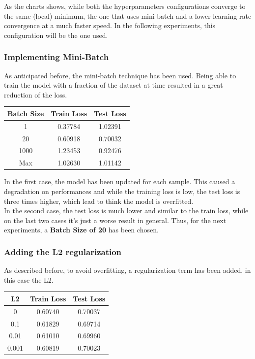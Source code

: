 \documentclass[
	letterpaper, %
	10pt, %
]{class}
\begin{document}
As the charts shows, while both the hyperparameters configurations converge to the same (local) minimum, the one that uses mini batch and a lower learning rate convergence at a much faster speed.
In the following experiments, this configuration will be the one used.

\subsubsection{Implementing Mini-Batch}

As anticipated before, the mini-batch technique has been used. Being able to train the model with a fraction of the dataset at time resulted in a great reduction of the loss.

\begin{center}
  \begin{tabular}{ |c|c|c| }
    \hline
    Batch Size & Train Loss & Test Loss \\
    \hline
    1          & 0.37784    & 1.02391   \\
    20         & 0.60918    & 0.70032   \\
    1000       & 1.23453    & 0.92476   \\
    Max        & 1.02630    & 1.01142   \\
    \hline
  \end{tabular}
\end{center}

In the first case, the model has been updated for each sample. This caused a degradation on performances and while the training loss is low, the test loss is three times higher, which lead to think the model is overfitted.\\

In the second case, the test loss is much lower and similar to the train loss, while on the last two cases it's just a worse result in general. Thus, for the next experiments, a \textbf{Batch Size of 20} has been chosen.

\subsubsection{Adding the L2 regularization}

As described before, to avoid overfitting, a regularization term has been added, in this case the L2.

\begin{center}
  \begin{tabular}{ |c|c|c| }
    \hline
    L2    & Train Loss & Test Loss \\
    \hline
    0     & 0.60740    & 0.70037   \\
    0.1   & 0.61829    & 0.69714   \\
    0.01  & 0.61010    & 0.69960   \\
    0.001 & 0.60819    & 0.70023   \\
    \hline
  \end{tabular}
\end{center}
\end{document}
